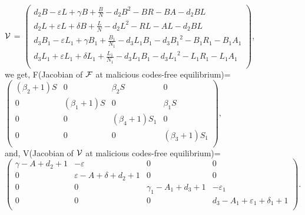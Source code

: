 \documentclass[conference]{IEEEtran}
\begin{document}
\begingroup
\everymath{\scriptstyle}
\scriptsize
 $\cal{V}$ =
 ${\left(
   \begin{array}{c}
     d_2 B -\varepsilon L +\gamma B +\frac{B}{N} -d_2 B^2 -B R - B A - d_2 B L \\
     d_2 L +\varepsilon L +\delta B +\frac{L}{N} -d_2 L^2 - R L - A L - d_2 B L \\
     d_3 B_1 - \varepsilon L_1+\gamma B_1 +\frac{B_1}{N_1}-d_3 L_1 B_1 -d_3 {B_1}^2 -B_1 R_1 -B_1 A_1 \\
     d_3 L_1 + \varepsilon L_1+\delta L_1 +\frac{L_1}{N_1}-d_3 L_1 B_1 -d_3 {L_1}^2 -L_1 R_1 -L_1 A_1 \\
   \end{array}
 \right)},$
\endgroup \\

\noindent we get, F(Jacobian of $\cal{F}$  at malicious codes-free equilibrium)= \\
\begingroup
\everymath{\scriptstyle}
\scriptsize
     $\left(
       \begin{array}{cccc}
         ({\beta}_2+1) S & 0 & {\beta}_2 S & 0 \\
         0 & ({\beta}_1+1) S & 0 & {\beta}_1 S \\
         0 & 0 & ({\beta}_4+1) S_1 & 0 \\
         0 & 0 & 0 & ({\beta}_3+1) S_1 \\
       \end{array}
     \right),$
\endgroup \\

\noindent and, V(Jacobian of $\cal{V}$  at malicious codes-free equilibrium)= \\
\begingroup
\everymath{\scriptstyle}
\scriptsize
 $\left(
   \begin{array}{cccc}
     \gamma-A+d_2+1 & -\varepsilon & 0 & 0 \\
     0 & \varepsilon-A+\delta+d_2+1 & 0 & 0 \\
     0 & 0 & {\gamma}_1-A_1+d_3+1 & -{\varepsilon}_1 \\
     0 & 0 & 0 & d_3-A_1+{\varepsilon}_1+{\delta}_1+1 \\
   \end{array}
 \right).$
\endgroup \\
\\
\end{document}
